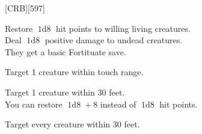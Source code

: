 

[CRB][597]



Restore \(\operatorname{1d8}\) hit points to willing living creatures.\\
Deal \(\operatorname{1d8}\) positive damage to undead creatures.\\
They get a basic Fortituate save.


Target 1 creature within touch range.


Target 1 creature within 30 feet.\\
You can restore \(\operatorname{1d8}+8\) instead of \(\operatorname{1d8}\) hit points.



Target every creature within 30 feet.
